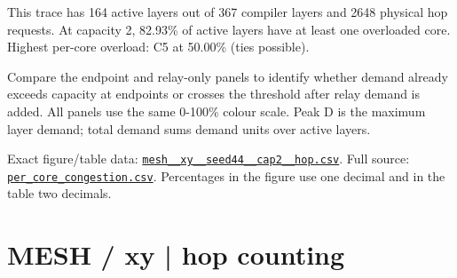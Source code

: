 \documentclass[10pt,a4paper]{article}
\begin{document}
This trace has 164 active layers out of 367 compiler layers and 2648 physical hop requests. At capacity 2, 82.93\% of active layers have at least one overloaded core. Highest per-core overload: C5 at 50.00\% (ties possible).\par
Compare the endpoint and relay-only panels to identify whether demand already exceeds capacity at endpoints or crosses the threshold after relay demand is added. All panels use the same 0-100\% colour scale. Peak D is the maximum layer demand; total demand sums demand units over active layers.\par
Exact figure/table data: \href{\detokenize{file:///home/dhruv-pansuriya/Documents/BTP/Compiler-Driven-ACE/output/pdf/qaoa_methods_congestion/tables/mesh__xy__seed44__cap2__hop.csv}}{\nolinkurl{mesh__xy__seed44__cap2__hop.csv}}. Full source: \href{\detokenize{file:///home/dhruv-pansuriya/Documents/BTP/Compiler-Driven-ACE/results/qaoa_2seed_2026-10-26/congestion/per_core_congestion.csv}}{\nolinkurl{per_core_congestion.csv}}. Percentages in the figure use one decimal and in the table two decimals.\par
\clearpage
\section*{MESH / xy | hop counting}
\end{document}

